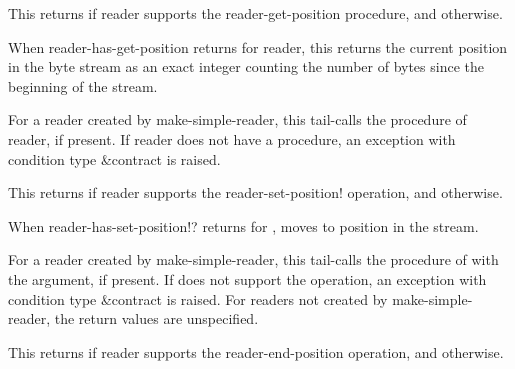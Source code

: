 \begin{entry}{%
}
   
This returns \schtrue{} if reader supports the reader-get-position
procedure, and \schfalse{} otherwise.
\end{entry}

\begin{entry}{%
}
   
When {\cf reader-has-get-position} returns \schtrue{} for reader, this
returns the current position in the byte stream as an exact integer
counting the number of bytes since the beginning of the stream.
   
For a reader created by {\cf make-simple-reader}, this tail-calls the
 procedure of reader, if present. If reader does not
have a  procedure, an exception with condition type
{\cf\&contract} is raised.
\end{entry}

\begin{entry}{%
}
   
This returns \schtrue{} if reader supports the {\cf reader-set-position!} operation, and
\schfalse{} otherwise.
\end{entry}

\begin{entry}{%
}

When {\cf reader-has-set-position!?} returns \schtrue{} for
, moves to position  in the stream.
 
For a reader created by {\cf make-simple-reader}, this tail-calls the
  procedure of  with the 
argument, if present.  If  does not support the operation,
an {\cf exception} with condition type {\cf\&contract} is raised.
For readers not created by {\cf make-simple-reader}, the return values
are unspecified.
\end{entry}

\begin{entry}{%
}
   
This returns \schtrue{} if reader supports the {\cf reader-end-position}
operation, and \schfalse{} otherwise.
\end{entry}   

